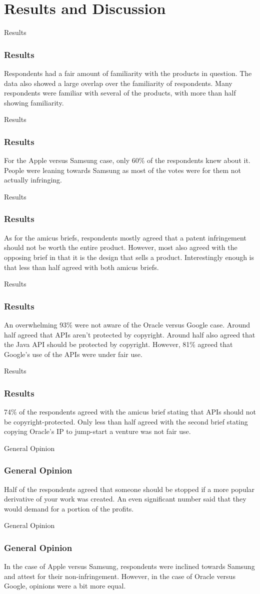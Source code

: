 \documentclass{beamer}
\begin{document}
\section{Results and Discussion}
\begin{frame}{Results}
\frametitle{Results}
	Respondents had a fair amount of familiarity with the products in question. \pause
	The data also showed a large overlap over the familiarity of respondents. \pause
	Many respondents were familiar with several of the products, with more than half
	showing familiarity.
\end{frame}
\begin{frame}{Results}
\frametitle{Results}
	For the Apple versus Samsung case, only 60\% of the respondents knew about it. \pause
	People were leaning towards Samsung as most of the votes were for them not actually infringing. \pause
\end{frame}
\begin{frame}{Results}
\frametitle{Results}
	As for the amicus briefs, respondents mostly agreed that a patent infringement should not be
	worth the entire product. \pause
	However, most also agreed with the opposing brief in that it is the design that sells a product. \pause
	Interestingly enough is that less than half agreed with both amicus briefs.
\end{frame}
\begin{frame}{Results}
\frametitle{Results}
	An overwhelming 93\% were not aware of the Oracle versus Google case. \pause
	Around half agreed that APIs aren't protected by copyright. \pause
	Around half also agreed that the Java API should be protected by copyright. \pause
	However, 81\% agreed that Google's use of the APIs were under fair use. \pause
\end{frame}
\begin{frame}{Results}
\frametitle{Results}
	74\% of the respondents agreed with the amicus brief stating that APIs should not be copyright-protected. \pause
	Only less than half agreed with the second brief stating copying Oracle's IP to jump-start a venture was not fair use. \pause
\end{frame}
\begin{frame}{General Opinion}
\frametitle{General Opinion}
	Half of the respondents agreed that someone should be stopped if a more popular derivative of your work was created. \pause
	An even significant number said that they would demand for a portion of the profits. \pause
\end{frame}
\begin{frame}{General Opinion}
\frametitle{General Opinion}
	In the case of Apple versus Samsung, respondents were inclined towards Samsung and attest for their non-infringement. \pause
	However, in the case of Oracle versus Google, opinions were a bit more equal. \pause
\end{frame}
\end{document}
